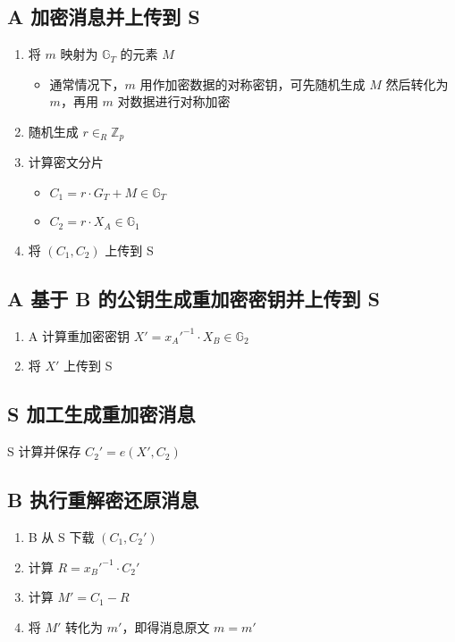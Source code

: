 \documentclass[a4paper,10pt]{article}
\newcommand{\bG}{\mathbb{G}}
\newcommand{\bZ}{\mathbb{Z}}
\begin{document}
\subsection{A 加密消息并上传到 S}

\begin{enumerate}
  \item 将 \(m\) 映射为 \(\bG_T\) 的元素 \(M\)
    \begin{itemize}
      \item 通常情况下，\(m\) 用作加密数据的对称密钥，可先随机生成 \(M\) 然后转化为 \(m\)，再用 \(m\) 对数据进行对称加密
    \end{itemize}
  \item 随机生成 \(r\in_R \bZ_p\)
  \item 计算密文分片
    \begin{itemize}
      \item \(C_1=r\cdot G_T+M \in\bG_T\)
      \item \(C_2=r\cdot X_A \in\bG_1\)
    \end{itemize}
  \item 将 \((C_1,C_2)\) 上传到 S
\end{enumerate}

\subsection{A 基于 B 的公钥生成重加密密钥并上传到 S}

\begin{enumerate}
  \item A 计算重加密密钥 \(X'=x_A'^{-1}\cdot X_B\in\bG_2\)
  \item 将 \(X'\) 上传到 S
\end{enumerate}

\subsection{S 加工生成重加密消息}

S 计算并保存 \(C_2'=e(X',C_2)\)

\subsection{B 执行重解密还原消息}

\begin{enumerate}
  \item B 从 S 下载 \((C_1,C_2')\)
  \item 计算 \(R=x_B'^{-1}\cdot C_2'\)
  \item 计算 \(M'=C_1-R\)
  \item 将 \(M'\) 转化为 \(m'\)，即得消息原文 \(m=m'\)
\end{enumerate}
\end{document}
